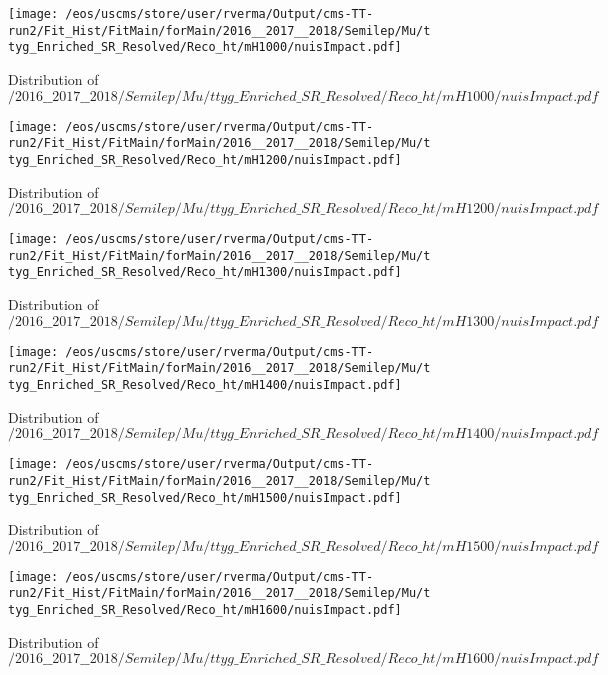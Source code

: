\begin{figure}
\centering
\texttt{[image: /eos/uscms/store/user/rverma/Output/cms-TT-run2/Fit\_Hist/FitMain/forMain/2016\_\_2017\_\_2018/Semilep/Mu/ttyg\_Enriched\_SR\_Resolved/Reco\_ht/mH1000/nuisImpact.pdf]}
\caption{Distribution of $/2016\_\_2017\_\_2018/Semilep/Mu/ttyg\_Enriched\_SR\_Resolved/Reco\_ht/mH1000/nuisImpact.pdf$}
\end{figure}

\begin{figure}
\centering
\texttt{[image: /eos/uscms/store/user/rverma/Output/cms-TT-run2/Fit\_Hist/FitMain/forMain/2016\_\_2017\_\_2018/Semilep/Mu/ttyg\_Enriched\_SR\_Resolved/Reco\_ht/mH1200/nuisImpact.pdf]}
\caption{Distribution of $/2016\_\_2017\_\_2018/Semilep/Mu/ttyg\_Enriched\_SR\_Resolved/Reco\_ht/mH1200/nuisImpact.pdf$}
\end{figure}

\begin{figure}
\centering
\texttt{[image: /eos/uscms/store/user/rverma/Output/cms-TT-run2/Fit\_Hist/FitMain/forMain/2016\_\_2017\_\_2018/Semilep/Mu/ttyg\_Enriched\_SR\_Resolved/Reco\_ht/mH1300/nuisImpact.pdf]}
\caption{Distribution of $/2016\_\_2017\_\_2018/Semilep/Mu/ttyg\_Enriched\_SR\_Resolved/Reco\_ht/mH1300/nuisImpact.pdf$}
\end{figure}

\begin{figure}
\centering
\texttt{[image: /eos/uscms/store/user/rverma/Output/cms-TT-run2/Fit\_Hist/FitMain/forMain/2016\_\_2017\_\_2018/Semilep/Mu/ttyg\_Enriched\_SR\_Resolved/Reco\_ht/mH1400/nuisImpact.pdf]}
\caption{Distribution of $/2016\_\_2017\_\_2018/Semilep/Mu/ttyg\_Enriched\_SR\_Resolved/Reco\_ht/mH1400/nuisImpact.pdf$}
\end{figure}

\begin{figure}
\centering
\texttt{[image: /eos/uscms/store/user/rverma/Output/cms-TT-run2/Fit\_Hist/FitMain/forMain/2016\_\_2017\_\_2018/Semilep/Mu/ttyg\_Enriched\_SR\_Resolved/Reco\_ht/mH1500/nuisImpact.pdf]}
\caption{Distribution of $/2016\_\_2017\_\_2018/Semilep/Mu/ttyg\_Enriched\_SR\_Resolved/Reco\_ht/mH1500/nuisImpact.pdf$}
\end{figure}

\begin{figure}
\centering
\texttt{[image: /eos/uscms/store/user/rverma/Output/cms-TT-run2/Fit\_Hist/FitMain/forMain/2016\_\_2017\_\_2018/Semilep/Mu/ttyg\_Enriched\_SR\_Resolved/Reco\_ht/mH1600/nuisImpact.pdf]}
\caption{Distribution of $/2016\_\_2017\_\_2018/Semilep/Mu/ttyg\_Enriched\_SR\_Resolved/Reco\_ht/mH1600/nuisImpact.pdf$}
\end{figure}

